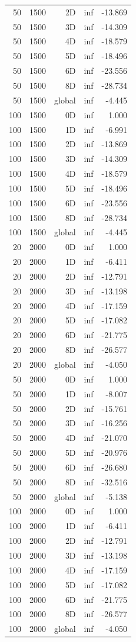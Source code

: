 \begin{longtable}{rrrrr}
50 & 1500 & 2D & inf & -13.869 \\
50 & 1500 & 3D & inf & -14.309 \\
50 & 1500 & 4D & inf & -18.579 \\
50 & 1500 & 5D & inf & -18.496 \\
50 & 1500 & 6D & inf & -23.556 \\
50 & 1500 & 8D & inf & -28.734 \\
50 & 1500 & global & inf & -4.445 \\
100 & 1500 & 0D & inf & 1.000 \\
100 & 1500 & 1D & inf & -6.991 \\
100 & 1500 & 2D & inf & -13.869 \\
100 & 1500 & 3D & inf & -14.309 \\
100 & 1500 & 4D & inf & -18.579 \\
100 & 1500 & 5D & inf & -18.496 \\
100 & 1500 & 6D & inf & -23.556 \\
100 & 1500 & 8D & inf & -28.734 \\
100 & 1500 & global & inf & -4.445 \\
20 & 2000 & 0D & inf & 1.000 \\
20 & 2000 & 1D & inf & -6.411 \\
20 & 2000 & 2D & inf & -12.791 \\
20 & 2000 & 3D & inf & -13.198 \\
20 & 2000 & 4D & inf & -17.159 \\
20 & 2000 & 5D & inf & -17.082 \\
20 & 2000 & 6D & inf & -21.775 \\
20 & 2000 & 8D & inf & -26.577 \\
20 & 2000 & global & inf & -4.050 \\
50 & 2000 & 0D & inf & 1.000 \\
50 & 2000 & 1D & inf & -8.007 \\
50 & 2000 & 2D & inf & -15.761 \\
50 & 2000 & 3D & inf & -16.256 \\
50 & 2000 & 4D & inf & -21.070 \\
50 & 2000 & 5D & inf & -20.976 \\
50 & 2000 & 6D & inf & -26.680 \\
50 & 2000 & 8D & inf & -32.516 \\
50 & 2000 & global & inf & -5.138 \\
100 & 2000 & 0D & inf & 1.000 \\
100 & 2000 & 1D & inf & -6.411 \\
100 & 2000 & 2D & inf & -12.791 \\
100 & 2000 & 3D & inf & -13.198 \\
100 & 2000 & 4D & inf & -17.159 \\
100 & 2000 & 5D & inf & -17.082 \\
100 & 2000 & 6D & inf & -21.775 \\
100 & 2000 & 8D & inf & -26.577 \\
100 & 2000 & global & inf & -4.050 \\
\end{longtable}
